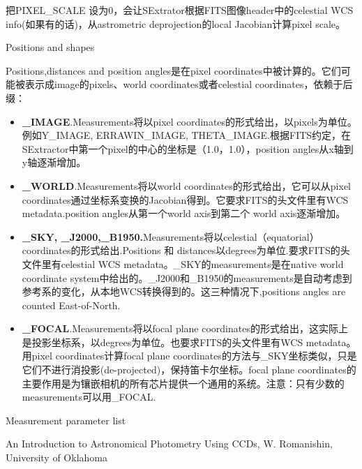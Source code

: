 \documentclass[CJK, utf8, GBK, oneside, a4paper, 12pt]{ctexart}
\begin{document}
把PIXEL\_SCALE 设为0，会让SExtrator根据FITS图像header中的celestial WCS info(如果有的话)，从astrometric deprojection的local Jacobian计算pixel scale。

Positions and shapes

Positions,distances and position angles是在pixel coordinates中被计算的。它们可能被表示成image的pixels、world coordinates或者celestial coordinates，依赖于后缀：

\begin{itemize}
    \item \textbf{\_IMAGE}.Measurements将以pixel coordinates的形式给出，以pixels为单位。例如Y\_IMAGE, ERRAWIN\_IMAGE, THETA\_IMAGE.根据FITS约定，在SExtractor中第一个pixel的中心的坐标是（1.0，1.0），position angles从x轴到y轴逐渐增加。
    \item \textbf{\_WORLD}.Measurements将以world coordinates的形式给出，它可以从pixel coordinates通过坐标系变换的Jacobian得到。它要求FITS的头文件里有WCS metadata.position angles从第一个world axis到第二个 world axis逐渐增加。
    \item \textbf{\_SKY, \_J2000,\_B1950.}Measurements将以celestial（equatorial） coordinates的形式给出.Positions 和 distances以degrees为单位.要求FITS的头文件里有celestial WCS metadata。\_SKY的measurements是在native world coordinate system中给出的。\_J2000和\_B1950的measurements是自动考虑到参考系的变化，从本地WCS转换得到的。这三种情况下,positions angles are counted East-of-North.
    \item \textbf{\_FOCAL}.Measurements将以focal plane coordinates的形式给出，这实际上是投影坐标系，以degrees为单位。也要求FITS的头文件里有WCS metadata。用pixel coordinates计算focal plane coordinates的方法与\_SKY坐标类似，只是它们不进行消投影(de-projected)，保持笛卡尔坐标。focal plane coordinates的主要作用是为镶嵌相机的所有芯片提供一个通用的系统。注意：只有少数的measurements可以用\_FOCAL.
\end{itemize}

Measurement parameter list




\begin{thebibliography}{1}
 An Introduction to Astronomical Photometry Using CCDs, W. Romanishin, University of Oklahoma
\end{thebibliography}
\end{document}
